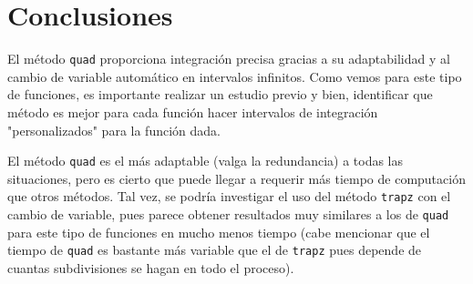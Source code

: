 \documentclass{article}
\begin{document}
\section{Conclusiones}
El método \texttt{quad} proporciona integración precisa gracias a su adaptabilidad y al cambio de variable automático en intervalos infinitos. Como vemos para este tipo de funciones, es importante realizar un estudio previo y bien, identificar que método es mejor para cada función hacer intervalos de integración "personalizados" para la función dada.

El método \texttt{quad} es el más adaptable (valga la redundancia) a todas las situaciones, pero es cierto que puede llegar a requerir más tiempo de computación que otros métodos. Tal vez, se podría investigar el uso del método \texttt{trapz} con el cambio de variable, pues parece obtener resultados muy similares a los de \texttt{quad} para este tipo de funciones en mucho menos tiempo (cabe mencionar que el tiempo de \texttt{quad} es bastante más variable que el de \texttt{trapz} pues depende de cuantas subdivisiones se hagan en todo el proceso). 
\end{document}
